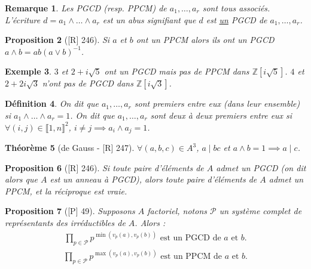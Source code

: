 \documentclass[10pt, a4paper, parskip=full, twoside, twocolumn]{report}
\newtheorem{definition}{Définition}
\newtheorem{theorem}[definition]{Théorème}
\newtheorem{proposition}[definition]{Proposition}
\newtheorem{example}[definition]{Exemple}
\newtheorem{remark}[definition]{Remarque}
\newcommand{\IZ}{\mathbb{Z}}
\begin{document}
\begin{remark}
	Les PGCD (resp. PPCM) de $a_1,\dots, a_r$ sont tous associés. L'écriture $d = a_1\wedge\dots\wedge a_r$ est un abus signifiant que $d$ est \underline{un} PGCD de $a_1,\dots,a_r$.
\end{remark}

\begin{proposition}[\textnormal{[R] 246}]
	Si $a$ et $b$ ont un PPCM alors ils ont un PGCD $a\wedge b = ab(a\vee b)^{-1}$.
\end{proposition}

\begin{example}
	$3$ et $2+i\sqrt{5}$ ont un PGCD mais pas de PPCM dans $\IZ[i\sqrt{5}]$.
	$4$ et $2+2i\sqrt{3}$ n'ont pas de PGCD dans $\IZ[i\sqrt{3}]$.
\end{example}

\begin{definition}
	On dit que $a_1,\dots, a_r$ sont \emph{premiers entre eux} (dans leur ensemble)
	si $a_1\wedge \dots\wedge a_r = 1$. On dit que $a_1, \dots, a_r$ sont \emph{deux à deux premiers entre eux} 
	si $\forall(i,j)\in \llbracket 1,n\rrbracket^2$, $i\neq j\implies a_i\wedge a_j = 1$.
\end{definition}

\begin{theorem}[de Gauss - \textnormal{[R] 247}]
	$\forall (a,b,c)\in A^3$, $a\mid bc$ et $a\wedge b=1 \implies a\mid c$. 
\end{theorem}

\begin{proposition}[\textnormal{[R] 246}]
	Si toute paire d'éléments de $A$ admet un PGCD (on dit alors que $A$ est un anneau à PGCD),
	alors toute paire d'éléments de $A$ admet un PPCM, et la réciproque est vraie.
\end{proposition}

\begin{proposition}[\textnormal{[P] 49}]
	Supposons $A$ factoriel, notons $\mathcal{P}$ un système
	complet de représentants des irréductibles de $A$. Alors :
	\begin{align*}
		\prod_{p\in\mathcal{P}} p^{\min(v_p(a), v_p(b))}\text{ est un PGCD de $a$ et $b$.}
	\end{align*}
	\begin{align*}
		\prod_{p\in\mathcal{P}} p^{\max(v_p(a), v_p(b))}\text{ est un PPCM de $a$ et $b$.}
	\end{align*}
\end{proposition}
\end{document}
